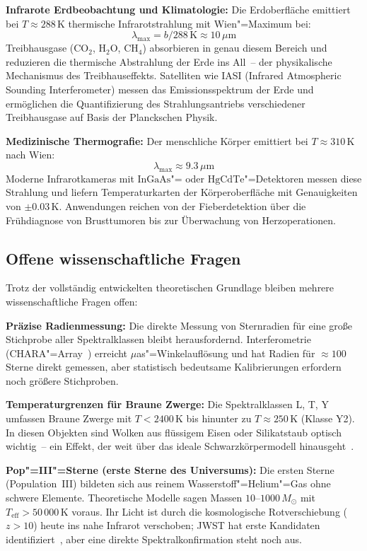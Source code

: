 ﻿\documentclass[a4paper,12pt]{article}
\theoremstyle{definition}
\begin{document}
\textbf{Infrarote Erdbeobachtung und Klimatologie:}
Die Erdoberfläche emittiert bei $T \approx 288\,\text{K}$ thermische
Infrarotstrahlung mit Wien"=Maximum bei:
\[
    \lambda_{\max} = b/288\,\text{K} \approx 10\,\mu\text{m}
\]
Treibhausgase (CO$_2$, H$_2$O, CH$_4$) absorbieren in genau diesem
Bereich und reduzieren die thermische Abstrahlung der Erde ins All~--
der physikalische Mechanismus des Treibhauseffekts. Satelliten wie
IASI (Infrared Atmospheric Sounding Interferometer) messen das Emissionsspektrum
der Erde und ermöglichen die Quantifizierung des Strahlungsantriebs
verschiedener Treibhausgase auf Basis der Planckschen Physik.

\textbf{Medizinische Thermografie:}
Der menschliche Körper emittiert bei $T \approx 310\,\text{K}$ nach Wien:
\[
    \lambda_{\max} \approx 9.3\,\mu\text{m}
\]
Moderne Infrarotkameras mit $\text{InGaAs}$"= oder $\text{HgCdTe}$"=Detektoren
messen diese Strahlung und liefern Temperaturkarten der Körperoberfläche
mit Genauigkeiten von $\pm 0.03\,\text{K}$. Anwendungen reichen von
der Fieberdetektion über die Frühdiagnose von Brusttumoren bis zur
Überwachung von Herzoperationen.

\subsection{Offene wissenschaftliche Fragen}

Trotz der vollständig entwickelten theoretischen Grundlage bleiben
mehrere wissenschaftliche Fragen offen:

\textbf{Präzise Radienmessung:} Die direkte Messung von Sternradien
für eine große Stichprobe aller Spektralklassen bleibt herausfordernd.
Interferometrie (CHARA"=Array~\cite{ten_brummelaar2005}) erreicht
$\mu$as"=Winkelauflösung und hat Radien für $\approx 100$ Sterne direkt
gemessen, aber statistisch bedeutsame Kalibrierungen erfordern noch
größere Stichproben.

\textbf{Temperaturgrenzen für Braune Zwerge:} Die Spektralklassen L, T, Y
umfassen Braune Zwerge mit $T < 2400\,\text{K}$ bis hinunter zu
$T \approx 250\,\text{K}$ (Klasse Y2). In diesen Objekten sind Wolken
aus flüssigem Eisen oder Silikatstaub optisch wichtig~-- ein Effekt,
der weit über das ideale Schwarzkörpermodell hinausgeht~\cite{cushing2011}.

\textbf{Pop"=III"=Sterne (erste Sterne des Universums):} Die ersten Sterne
(Population~III) bildeten sich aus reinem Wasserstoff"=Helium"=Gas ohne
schwere Elemente. Theoretische Modelle sagen Massen $10$--$1000\,M_\odot$
mit $T_{\text{eff}} > 50\,000\,\text{K}$ voraus. Ihr Licht ist durch
die kosmologische Rotverschiebung ($z > 10$) heute ins nahe Infrarot
verschoben; JWST hat erste Kandidaten identifiziert~\cite{castellano2022},
aber eine direkte Spektralkonfirmation steht noch aus.
\end{document}
